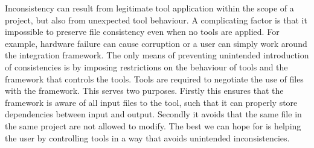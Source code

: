 \documentclass{article}
\newcommand{\squadt}{SQuADT\xspace}
\begin{document}
  Inconsistency can result from legitimate tool application within the scope of
  a project, but also from unexpected tool behaviour. A complicating factor is
  that it impossible to preserve file consistency even when no tools are
  applied. For example, hardware failure can cause corruption or a user can
  simply work around the integration framework. The only means of preventing
  unintended introduction of consistencies is by imposing restrictions on the
  behaviour of tools and the framework that controls the tools.  Tools are
  required to negotiate the use of files with the framework. This serves two
  purposes.  Firstly this ensures that the framework is aware of all input files
  to the tool, such that it can properly store dependencies between input and
  output. Secondly it avoids that the same file in the same project
  are not allowed to modify.  The best we can hope for is helping the user by
  controlling tools in a way that avoids unintended inconsistencies.
  

  
\end{document}
